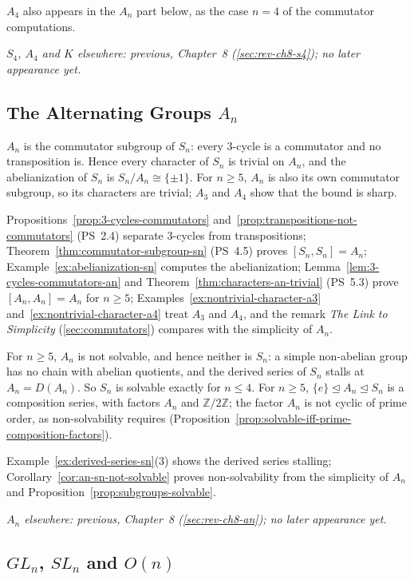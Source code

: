 \documentclass[11pt]{report}
\begin{document}
$A_4$ also appears in the $A_n$ part below, as the case $n = 4$ of the commutator computations.

\textit{$S_4$, $A_4$ and $K$ elsewhere: previous, Chapter~8 (\ref{sec:rev-ch8-s4}); no later appearance yet.}

\subsection{\texorpdfstring{The Alternating Groups $A_n$}{The Alternating Groups Aₙ}}\label{sec:rev-ch9-an}

$A_n$ is the commutator subgroup of $S_n$: every $3$-cycle is a commutator and no transposition is. Hence every character of $S_n$ is trivial on $A_n$, and the abelianization of $S_n$ is $S_n/A_n \cong \{\pm 1\}$. For $n \geq 5$, $A_n$ is also its own commutator subgroup, so its characters are trivial; $A_3$ and $A_4$ show that the bound is sharp.

Propositions~\ref{prop:3-cycles-commutators} and~\ref{prop:transpositions-not-commutators} (PS~2.4) separate $3$-cycles from transpositions; Theorem~\ref{thm:commutator-subgroup-sn} (PS~4.5) proves $[S_n, S_n] = A_n$; Example~\ref{ex:abelianization-sn} computes the abelianization; Lemma~\ref{lem:3-cycles-commutators-an} and Theorem~\ref{thm:characters-an-trivial} (PS~5.3) prove $[A_n, A_n] = A_n$ for $n \geq 5$; Examples~\ref{ex:nontrivial-character-a3} and~\ref{ex:nontrivial-character-a4} treat $A_3$ and $A_4$, and the remark \emph{The Link to Simplicity} (\ref{sec:commutators}) compares with the simplicity of $A_n$.

For $n \geq 5$, $A_n$ is not solvable, and hence neither is $S_n$: a simple non-abelian group has no chain with abelian quotients, and the derived series of $S_n$ stalls at $A_n = D(A_n)$. So $S_n$ is solvable exactly for $n \leq 4$. For $n \geq 5$, $\{e\} \trianglelefteq A_n \trianglelefteq S_n$ is a composition series, with factors $A_n$ and $\mathbb{Z}/2\mathbb{Z}$; the factor $A_n$ is not cyclic of prime order, as non-solvability requires (Proposition~\ref{prop:solvable-iff-prime-composition-factors}).

Example~\ref{ex:derived-series-sn}(3) shows the derived series stalling; Corollary~\ref{cor:an-sn-not-solvable} proves non-solvability from the simplicity of $A_n$ and Proposition~\ref{prop:subgroups-solvable}.

\textit{$A_n$ elsewhere: previous, Chapter~8 (\ref{sec:rev-ch8-an}); no later appearance yet.}

\subsection{\texorpdfstring{$GL_n$, $SL_n$ and $O(n)$}{GLₙ, SLₙ and O(n)}}\label{sec:rev-ch9-gl}
\end{document}
